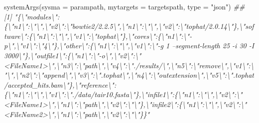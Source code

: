 \documentclass[14pt,]{article}
\newcommand{\hlstr}[1]{\textcolor[rgb]{0.251,0.627,0.251}{#1}}%
\newcommand{\hlcom}[1]{\textcolor[rgb]{0.502,0.502,0.502}{\textit{#1}}}%
\newcommand{\hlstd}[1]{\textcolor[rgb]{0.251,0.251,0.251}{#1}}%
\newcommand{\hlkwc}[1]{\textcolor[rgb]{0.251,0.251,0.251}{#1}}%
\newcommand{\hlkwd}[1]{\textcolor[rgb]{0.878,0.439,0.125}{#1}}%
\newenvironment{Shaded}{\begin{myshaded}}{\end{myshaded}}
\newcommand{\KeywordTok}[1]{\hlkwd{#1}}
\newcommand{\DataTypeTok}[1]{\hlkwc{#1}}
\newcommand{\StringTok}[1]{\hlstr{#1}}
\newcommand{\CommentTok}[1]{\hlcom{#1}}
\newcommand{\NormalTok}[1]{\hlstd{#1}}
\begin{document}
\begin{Shaded}
\begin{Highlighting}[]
\KeywordTok{systemArgs}\NormalTok{(}\DataTypeTok{sysma =}\NormalTok{ parampath, }\DataTypeTok{mytargets =}\NormalTok{ targetspath, }\DataTypeTok{type =} \StringTok{"json"}\NormalTok{)}
\CommentTok{## [1] "\{\textbackslash{}"modules\textbackslash{}":\{\textbackslash{}"n1\textbackslash{}":\textbackslash{}"\textbackslash{}",\textbackslash{}"v2\textbackslash{}":\textbackslash{}"bowtie2/2.2.5\textbackslash{}",\textbackslash{}"n1\textbackslash{}":\textbackslash{}"\textbackslash{}",\textbackslash{}"v2\textbackslash{}":\textbackslash{}"tophat/2.0.14\textbackslash{}"\},\textbackslash{}"software\textbackslash{}":\{\textbackslash{}"n1\textbackslash{}":\textbackslash{}"\textbackslash{}",\textbackslash{}"v1\textbackslash{}":\textbackslash{}"tophat\textbackslash{}"\},\textbackslash{}"cores\textbackslash{}":\{\textbackslash{}"n1\textbackslash{}":\textbackslash{}"-p\textbackslash{}",\textbackslash{}"v1\textbackslash{}":\textbackslash{}"4\textbackslash{}"\},\textbackslash{}"other\textbackslash{}":\{\textbackslash{}"n1\textbackslash{}":\textbackslash{}"\textbackslash{}",\textbackslash{}"v1\textbackslash{}":\textbackslash{}"-g 1 --segment-length 25 -i 30 -I 3000\textbackslash{}"\},\textbackslash{}"outfile1\textbackslash{}":\{\textbackslash{}"n1\textbackslash{}":\textbackslash{}"-o\textbackslash{}",\textbackslash{}"v2\textbackslash{}":\textbackslash{}"<FileName1>\textbackslash{}",\textbackslash{}"n3\textbackslash{}":\textbackslash{}"path\textbackslash{}",\textbackslash{}"v4\textbackslash{}":\textbackslash{}"./results/\textbackslash{}",\textbackslash{}"n5\textbackslash{}":\textbackslash{}"remove\textbackslash{}",\textbackslash{}"v1\textbackslash{}":\textbackslash{}"\textbackslash{}",\textbackslash{}"n2\textbackslash{}":\textbackslash{}"append\textbackslash{}",\textbackslash{}"v3\textbackslash{}":\textbackslash{}".tophat\textbackslash{}",\textbackslash{}"n4\textbackslash{}":\textbackslash{}"outextension\textbackslash{}",\textbackslash{}"v5\textbackslash{}":\textbackslash{}".tophat/accepted_hits.bam\textbackslash{}"\},\textbackslash{}"reference\textbackslash{}":\{\textbackslash{}"n1\textbackslash{}":\textbackslash{}"\textbackslash{}",\textbackslash{}"v1\textbackslash{}":\textbackslash{}"./data/tair10.fasta\textbackslash{}"\},\textbackslash{}"infile1\textbackslash{}":\{\textbackslash{}"n1\textbackslash{}":\textbackslash{}"\textbackslash{}",\textbackslash{}"v2\textbackslash{}":\textbackslash{}"<FileName1>\textbackslash{}",\textbackslash{}"n1\textbackslash{}":\textbackslash{}"path\textbackslash{}",\textbackslash{}"v2\textbackslash{}":\textbackslash{}"\textbackslash{}"\},\textbackslash{}"infile2\textbackslash{}":\{\textbackslash{}"n1\textbackslash{}":\textbackslash{}"\textbackslash{}",\textbackslash{}"v2\textbackslash{}":\textbackslash{}"<FileName2>\textbackslash{}",\textbackslash{}"n1\textbackslash{}":\textbackslash{}"path\textbackslash{}",\textbackslash{}"v2\textbackslash{}":\textbackslash{}"\textbackslash{}"\}\}"}
\end{Highlighting}
\end{Shaded}
\end{document}
